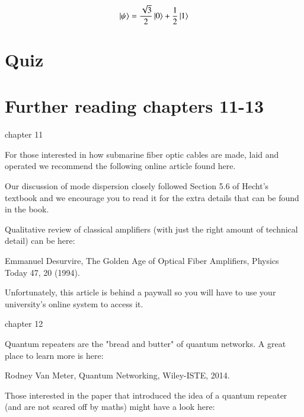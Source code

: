 \newpage
\begin{exercises}
\begin{equation*}
\left| \psi \right\rangle = \frac{\sqrt{3}}{2}\left| 0 \right\rangle + \frac{1}{2}\left| 1 \right\rangle
\end{equation*}


\end{exercises}

\newpage
\section*{Quiz}


\section*{Further reading chapters 11-13}

chapter 11

For those interested in how submarine fiber optic cables are made, laid and operated we recommend the following online article found here.

Our discussion of mode dispersion closely followed Section 5.6 of Hecht’s textbook and we encourage you to read it for the extra details that can be found in the book.

Qualitative review of classical amplifiers (with just the right amount of technical detail) can be here:

Emmanuel Desurvire, The Golden Age of Optical Fiber Amplifiers, Physics Today 47, 20 (1994).

Unfortunately, this article is behind a paywall so you will have to use your university’s online system to access it.

chapter 12

Quantum repeaters are the "bread and butter" of quantum networks. A great place to learn more is here:

Rodney Van Meter, Quantum Networking, Wiley-ISTE, 2014.

Those interested in the paper that introduced the idea of a quantum repeater (and are not scared off by maths) might have a look here:

